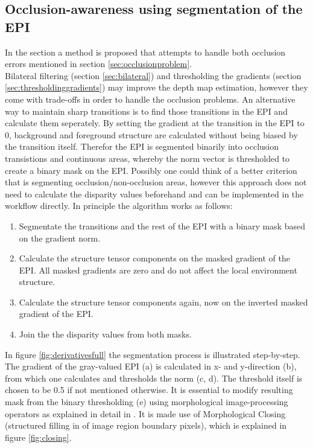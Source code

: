 \documentclass  [
  paper    = a4,
  BCOR     = 10mm,
  twoside,
  fontsize = 12pt,
  fleqn,
  toc      = bibnumbered,
  toc      = listofnumbered,
  numbers  = noendperiod,
  headings = normal,
  listof   = leveldown,
  version  = 3.03
]                                       {scrreprt}
\begin{document}
 \subsection{Occlusion-awareness using segmentation of the EPI}
 \label{sec:occlusionsegmentation}
 In the section a method is proposed that attempts to handle both occlusion errors mentioned in section \ref{sec:occlusionproblem}.\\
 Bilateral filtering (section \ref{sec:bilateral}) and thresholding the gradients (section \ref{sec:thresholdinggradients}) may improve the depth map estimation, however they come with trade-offs in order to handle the occlusion problems. An alternative way to maintain sharp transitions is to find those transitions in the EPI and calculate them seperately. By setting the gradient at the transition in the EPI to 0, background and foreground structure are calculated without being biased by the transition itself. Therefor the EPI is segmented binarily into occlusion transistions and continuous areas, whereby the norm vector is thresholded to create a binary mask on the EPI. Possibly one could think of a better criterion that is segmenting occlusion/non-occlusion areas, however this approach does not need to calculate the disparity values beforehand and can be implemented in the workflow directly. In principle the algorithm works as follows:
 \begin{enumerate}
 	\item Segmentate the transitions and the rest of the EPI with a binary mask based on the gradient norm.
 	\item Calculate the structure tensor components on the masked gradient of the EPI. All masked gradients are zero and do not affect the local environment structure.
 	\item Calculate the structure tensor components again, now on the inverted masked gradient of the EPI.
 	\item Join the the disparity values from both masks.
 \end{enumerate}
 In figure \ref{fig:derivativesfull} the segmentation process is illustrated step-by-step. The gradient of the gray-valued EPI (a) is calculated in x- and y-direction (b), from which one calculates and thresholds the norm (c, d). The threshold itself is chosen to be 0.5 if not mentioned otherwise. It is essential to modify resulting mask from the binary thresholding (e)  using morphological image-processing operators as explained in detail in \cite{homepages.inf.ed.ac.uk}. It is made use of Morphological Closing (structured filling in of image region boundary pixels), which is explained in figure \ref{fig:closing}.\\
\end{document}
